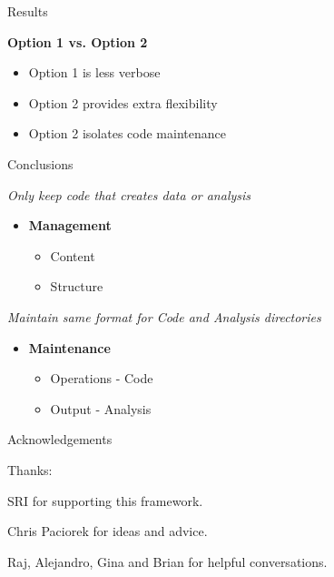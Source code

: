 \documentclass{beamer}
\begin{document}
\begin{frame}{Results}

\textbf{Option 1 vs. Option 2}
\begin{itemize}
\item Option 1 is less verbose
\item Option 2 provides extra flexibility
\item Option 2 isolates code maintenance
\end{itemize}

\end{frame}


\begin{frame}{Conclusions}

\emph{Only keep code that creates data or analysis}
\begin{itemize}

\item \textbf{Management}
\begin{itemize}
\item Content
\item Structure
\end{itemize}
\bigskip
\end{itemize}
\emph{ Maintain same format for  Code and Analysis directories}
\begin{itemize}
\item \textbf{Maintenance}
\begin{itemize}
\item Operations - Code
\item Output - Analysis
\end{itemize}

\end{itemize}

\end{frame}

\begin{frame}{Acknowledgements}

Thanks:

\bigskip

SRI for supporting this framework.\\
\bigskip

Chris Paciorek for ideas and advice.\\
\bigskip

Raj, Alejandro, Gina and Brian for helpful conversations.\\
 
\end{frame}
\end{document}
